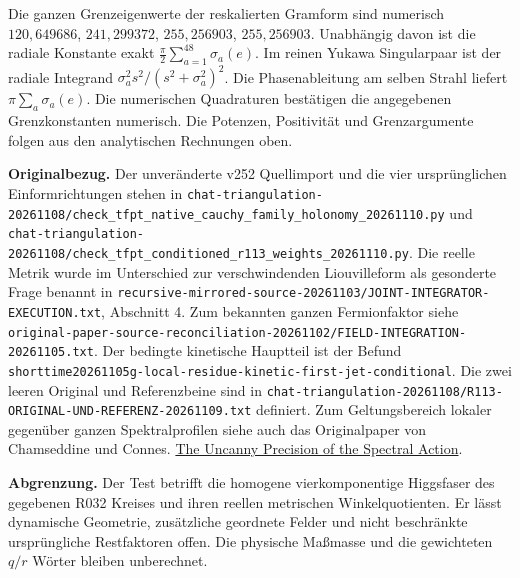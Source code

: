 \documentclass[11pt,a4paper]{article}
\begin{document}
Die ganzen Grenzeigenwerte der reskalierten Gramform sind numerisch
$120{,}649686$, $241{,}299372$, $255{,}256903$, $255{,}256903$.
Unabhängig davon ist die radiale Konstante exakt $\frac\pi2\sum_{a=1}^{48}\sigma_a(e)$.
Im reinen Yukawa Singularpaar ist der radiale Integrand
$\sigma_a^2s^2/(s^2+\sigma_a^2)^2$.
Die Phasenableitung am selben Strahl liefert $\pi\sum_a\sigma_a(e)$.
Die numerischen Quadraturen bestätigen die angegebenen Grenzkonstanten numerisch. Die Potenzen, Positivität und Grenzargumente folgen aus den analytischen Rechnungen oben.

\textbf{Originalbezug.} Der unveränderte v252 Quellimport und die vier ursprünglichen Einformrichtungen stehen in
\nolinkurl{chat-triangulation-20261108/check_tfpt_native_cauchy_family_holonomy_20261110.py}
und
\nolinkurl{chat-triangulation-20261108/check_tfpt_conditioned_r113_weights_20261110.py}.
Die reelle Metrik wurde im Unterschied zur verschwindenden Liouvilleform als gesonderte Frage benannt in
\nolinkurl{recursive-mirrored-source-20261103/JOINT-INTEGRATOR-EXECUTION.txt}, Abschnitt 4.
Zum bekannten ganzen Fermionfaktor siehe
\nolinkurl{original-paper-source-reconciliation-20261102/FIELD-INTEGRATION-20261105.txt}.
Der bedingte kinetische Hauptteil ist der Befund \nolinkurl{shorttime20261105g-local-residue-kinetic-first-jet-conditional}.
Die zwei leeren Original und Referenzbeine sind in \nolinkurl{chat-triangulation-20261108/R113-ORIGINAL-UND-REFERENZ-20261109.txt} definiert.
Zum Geltungsbereich lokaler gegenüber ganzen Spektralprofilen siehe auch das Originalpaper von Chamseddine und Connes. \href{https://arxiv.org/abs/0812.0165}{The Uncanny Precision of the Spectral Action}.

\textbf{Abgrenzung.} Der Test betrifft die homogene vierkomponentige Higgsfaser des gegebenen R032 Kreises und ihren reellen metrischen Winkelquotienten. Er lässt dynamische Geometrie, zusätzliche geordnete Felder und nicht beschränkte ursprüngliche Restfaktoren offen. Die physische Maßmasse und die gewichteten $q/r$ Wörter bleiben unberechnet.
\end{document}
